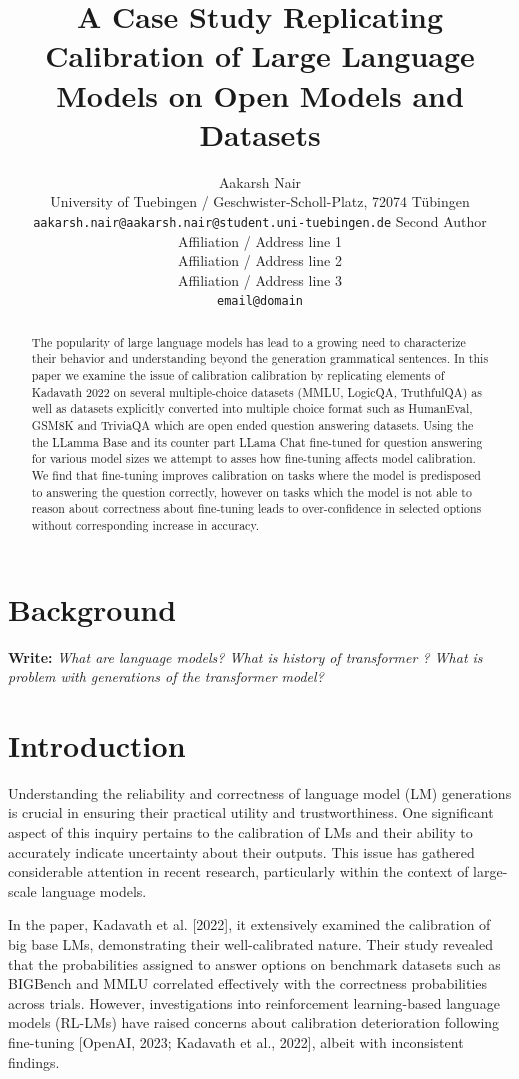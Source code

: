 \documentclass[11pt]{article}
\title{A Case Study Replicating Calibration of Large Language Models on Open Models and Datasets}
\author{Aakarsh Nair\\
  University of Tuebingen / Geschwister-Scholl-Platz, 72074 Tübingen\\
  \texttt{aakarsh.nair@aakarsh.nair@student.uni-tuebingen.de} 
  Second Author \\
  Affiliation / Address line 1 \\
  Affiliation / Address line 2 \\
  Affiliation / Address line 3 \\
  \texttt{email@domain} \\}
\begin{document}
\maketitle

\begin{abstract}
The popularity of large language models has lead to a growing need to characterize their behavior and understanding beyond the generation grammatical sentences. In this paper we 
examine the issue of calibration  calibration by replicating elements of  
Kadavath 2022 \cite{kadavath2022language} on several multiple-choice datasets (MMLU, LogicQA, TruthfulQA) as well as datasets explicitly converted into multiple choice format such as HumanEval, GSM8K and TriviaQA which are open ended question answering datasets.
Using the the LLamma Base and its counter part LLama Chat fine-tuned for question answering for various model sizes we attempt to asses how fine-tuning affects model calibration. We find that fine-tuning improves calibration on tasks where the model is predisposed to answering the question correctly, however on tasks which the model is not able to reason about correctness about fine-tuning leads to over-confidence in selected options without corresponding increase in accuracy.
\end{abstract}

\section{Background}
\textbf{Write: }
 \emph{What are language models? What is history of transformer ? What is problem with generations of the transformer model?}


\section{Introduction}

Understanding the reliability and correctness of language model (LM) generations is crucial in ensuring their practical utility and trustworthiness. One significant aspect of this inquiry pertains to the calibration of LMs and their ability to accurately indicate uncertainty about their outputs. This issue has gathered considerable attention in recent research, particularly within the context of large-scale language models.

In the paper, Kadavath et al. [2022], it extensively examined the calibration of big base LMs, demonstrating their well-calibrated nature. Their study revealed that the probabilities assigned to answer options on benchmark datasets such as BIGBench and MMLU correlated effectively with the correctness probabilities across trials. However, investigations into reinforcement learning-based language models (RL-LMs) have raised concerns about calibration deterioration following fine-tuning [OpenAI, 2023; Kadavath et al., 2022], albeit with inconsistent findings.
\end{document}
